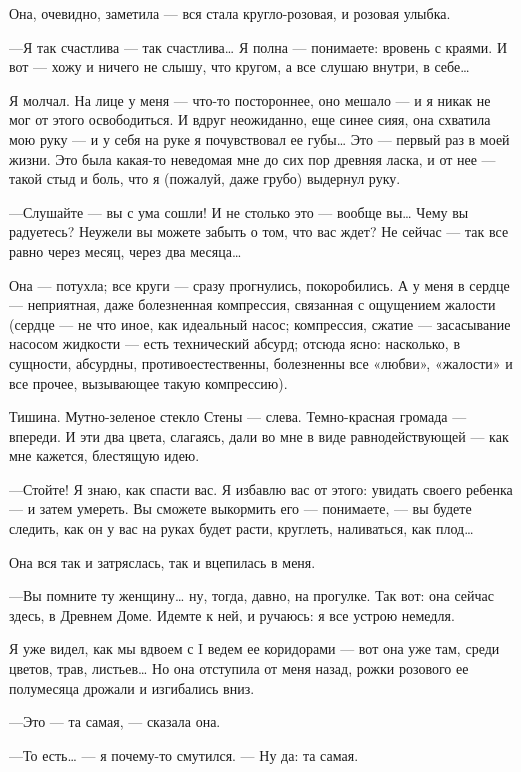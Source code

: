 \documentclass[11pt,openany]{book}
\begin{document}
Она, очевидно, заметила --- вся стала кругло-розовая, и розовая улыбка.

---Я так счастлива --- так счастлива\ldots{} Я полна --- понимаете: вровень с краями. И вот --- хожу и ничего не слышу, что кругом, а все слушаю внутри, в себе\ldots{}

Я молчал. На лице у меня --- что-то постороннее, оно мешало --- и я никак не мог от этого освободиться. И вдруг неожиданно, еще синее сияя, она схватила мою руку --- и у себя на руке я почувствовал ее губы\ldots{} Это --- первый раз в моей жизни. Это была какая-то неведомая мне до сих пор древняя ласка, и от нее --- такой стыд и боль, что я (пожалуй, даже грубо) выдернул руку.

---Слушайте --- вы с ума сошли! И не столько это --- вообще вы\ldots{} Чему вы радуетесь? Неужели вы можете забыть о том, что вас ждет? Не сейчас --- так все равно через месяц, через два месяца\ldots{}

Она --- потухла; все круги --- сразу прогнулись, покоробились. А у меня в сердце --- неприятная, даже болезненная компрессия, связанная с ощущением жалости (сердце --- не что иное, как идеальный насос; компрессия, сжатие --- засасывание насосом жидкости --- есть технический абсурд; отсюда ясно: насколько, в сущности, абсурдны, противоестественны, болезненны все «любви», «жалости» и все прочее, вызывающее такую компрессию).

Тишина. Мутно-зеленое стекло Стены --- слева. Темно-красная громада --- впереди. И эти два цвета, слагаясь, дали во мне в виде равнодействующей --- как мне кажется, блестящую идею.

---Стойте! Я знаю, как спасти вас. Я избавлю вас от этого: увидать своего ребенка --- и затем умереть. Вы сможете выкормить его --- понимаете, --- вы будете следить, как он у вас на руках будет расти, круглеть, наливаться, как плод\ldots{}

Она вся так и затряслась, так и вцепилась в меня.

---Вы помните ту женщину\ldots{} ну, тогда, давно, на прогулке. Так вот: она сейчас здесь, в Древнем Доме. Идемте к ней, и ручаюсь: я все устрою немедля.

Я уже видел, как мы вдвоем с I ведем ее коридорами --- вот она уже там, среди цветов, трав, листьев\ldots{} Но она отступила от меня назад, рожки розового ее полумесяца дрожали и изгибались вниз.

---Это --- та самая, --- сказала она.

---То есть\ldots{} --- я почему-то смутился. --- Ну да: та самая.
\end{document}
